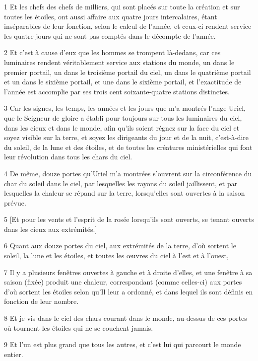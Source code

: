 \par 1 Et les chefs des chefs de milliers, qui sont placés sur toute la création et sur toutes les étoiles, ont aussi affaire aux quatre jours intercalaires, étant inséparables de leur fonction, selon le calcul de l'année, et ceux-ci rendent service les quatre jours qui ne sont pas comptés dans le décompte de l'année.
\par 2 Et c'est à cause d'eux que les hommes se trompent là-dedans, car ces luminaires rendent véritablement service aux stations du monde, un dans le premier portail, un dans le troisième portail du ciel, un dans le quatrième portail et un dans le sixième portail, et une dans le sixième portail, et l'exactitude de l'année est accomplie par ses trois cent soixante-quatre stations distinctes.
\par 3 Car les signes, les temps, les années et les jours que m'a montrés l'ange Uriel, que le Seigneur de gloire a établi pour toujours sur tous les luminaires du ciel, dans les cieux et dans le monde, afin qu'ils soient régnez sur la face du ciel et soyez visible sur la terre, et soyez les dirigeants du jour et de la nuit, c'est-à-dire du soleil, de la lune et des étoiles, et de toutes les créatures ministérielles qui font leur révolution dans tous les chars du ciel.
\par 4 De même, douze portes qu'Uriel m'a montrées s'ouvrent sur la circonférence du char du soleil dans le ciel, par lesquelles les rayons du soleil jaillissent, et par lesquelles la chaleur se répand sur la terre, lorsqu'elles sont ouvertes à la saison prévue.
\par 5 [Et pour les vents et l'esprit de la rosée lorsqu'ils sont ouverts, se tenant ouverts dans les cieux aux extrémités.]
\par 6 Quant aux douze portes du ciel, aux extrémités de la terre, d'où sortent le soleil, la lune et les étoiles, et toutes les œuvres du ciel à l'est et à l'ouest,
\par 7 Il y a plusieurs fenêtres ouvertes à gauche et à droite d'elles, et une fenêtre à sa saison (fixée) produit une chaleur, correspondant (comme celles-ci) aux portes d'où sortent les étoiles selon qu'Il leur a ordonné, et dans lequel ils sont définis en fonction de leur nombre.
\par 8 Et je vis dans le ciel des chars courant dans le monde, au-dessus de ces portes où tournent les étoiles qui ne se couchent jamais.
\par 9 Et l'un est plus grand que tous les autres, et c'est lui qui parcourt le monde entier.

